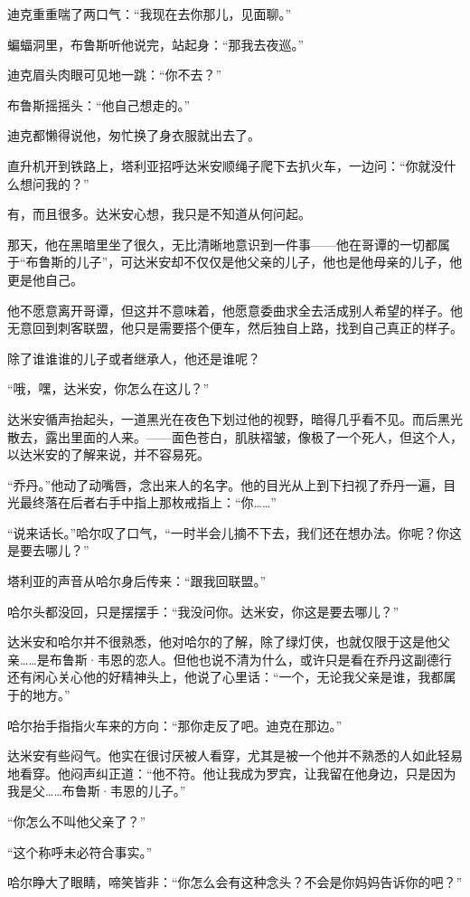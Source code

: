 \documentclass[../main]{subfiles}
\begin{document}
迪克重重喘了两口气：“我现在去你那儿，见面聊。”

蝙蝠洞里，布鲁斯听他说完，站起身：“那我去夜巡。”

迪克眉头肉眼可见地一跳：“你不去？”

布鲁斯摇摇头：“他自己想走的。”

迪克都懒得说他，匆忙换了身衣服就出去了。

直升机开到铁路上，塔利亚招呼达米安顺绳子爬下去扒火车，一边问：“你就没什么想问我的？”

有，而且很多。达米安心想，我只是不知道从何问起。

那天，他在黑暗里坐了很久，无比清晰地意识到一件事——他在哥谭的一切都属于“布鲁斯的儿子”，可达米安却不仅仅是他父亲的儿子，他也是他母亲的儿子，他更是他自己。

他不愿意离开哥谭，但这并不意味着，他愿意委曲求全去活成别人希望的样子。他无意回到刺客联盟，他只是需要搭个便车，然后独自上路，找到自己真正的样子。

除了谁谁谁的儿子或者继承人，他还是谁呢？

“哦，嘿，达米安，你怎么在这儿？”

达米安循声抬起头，一道黑光在夜色下划过他的视野，暗得几乎看不见。而后黑光散去，露出里面的人来。——面色苍白，肌肤褶皱，像极了一个死人，但这个人，以达米安的了解来说，并不容易死。

“乔丹。”他动了动嘴唇，念出来人的名字。他的目光从上到下扫视了乔丹一遍，目光最终落在后者右手中指上那枚戒指上：“你\ldots\ldots”

“说来话长。”哈尔叹了口气，“一时半会儿摘不下去，我们还在想办法。你呢？你这是要去哪儿？”

塔利亚的声音从哈尔身后传来：“跟我回联盟。”

哈尔头都没回，只是摆摆手：“我没问你。达米安，你这是要去哪儿？”

达米安和哈尔并不很熟悉，他对哈尔的了解，除了绿灯侠，也就仅限于这是他父亲……是布鲁斯·韦恩的恋人。但他也说不清为什么，或许只是看在乔丹这副德行还有闲心关心他的好精神头上，他说了心里话：“一个，无论我父亲是谁，我都属于的地方。”

哈尔抬手指指火车来的方向：“那你走反了吧。迪克在那边。”

达米安有些闷气。他实在很讨厌被人看穿，尤其是被一个他并不熟悉的人如此轻易地看穿。他闷声纠正道：“他不符。他让我成为罗宾，让我留在他身边，只是因为我是父……布鲁斯·韦恩的儿子。”

“你怎么不叫他父亲了？”

“这个称呼未必符合事实。”

哈尔睁大了眼睛，啼笑皆非：“你怎么会有这种念头？不会是你妈妈告诉你的吧？”
\end{document}
